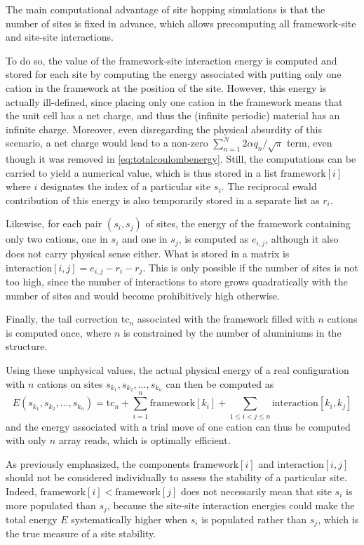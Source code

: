 \documentclass[main.tex]{subfiles}
\begin{document}
The main computational advantage of site hopping simulations is that the number of sites is fixed in advance, which allows precomputing all framework-site and site-site interactions.

To do so, the value of the framework-site interaction energy is computed and stored for each site by computing the energy associated with putting only one cation in the framework at the position of the site. However, this energy is actually ill-defined, since placing only one cation in the framework means that the unit cell has a net charge, and thus the (infinite periodic) material has an infinite charge. Moreover, even disregarding the physical absurdity of this scenario, a net charge would lead to a non-zero $\sum_{n=1}^N2\alpha q_n/\sqrt\pi$ term, even though it was removed in \cref{eq:totalcoulombenergy}. Still, the computations can be carried to yield a numerical value, which is thus stored in a list $\text{framework}[i]$ where $i$ designates the index of a particular site $s_i$. The reciprocal ewald contribution of this energy is also temporarily stored in a separate list as $r_i$.

Likewise, for each pair $(s_i,s_j)$ of sites, the energy of the framework containing only two cations, one in $s_i$ and one in $s_j$, is computed as $e_{i,j}$, although it also does not carry physical sense either. What is stored in a matrix is
$\text{interaction}[i,j] = e_{i,j} - r_i - r_j$.
This is only possible if the number of sites is not too high, since the number of interactions to store grows quadratically with the number of sites and would become prohibitively high otherwise.

Finally, the tail correction $\text{tc}_n$ associated with the framework filled with $n$ cations is computed once, where $n$ is constrained by the number of aluminiums in the structure.

Using these unphysical values, the actual physical energy of a real configuration with $n$ cations on sites $s_{k_1}, s_{k_2}, \ldots, s_{k_n}$ can then be computed as
\[E(s_{k_1}, s_{k_2}, \ldots, s_{k_n}) = \text{tc}_n + \sum_{i=1}^n\text{framework}[k_i] + \sum_{1\le i<j \le n}\text{interaction}[k_i,k_j]\]
and the energy associated with a trial move of one cation can thus be computed with only $n$ array reads, which is optimally efficient.

As previously emphasized, the components $\text{framework}[i]$ and $\text{interaction}[i,j]$ should not be considered individually to assess the stability of a particular site. Indeed, $\text{framework}[i] < \text{framework}[j]$ does not necessarily mean that site $s_i$ is more populated than $s_j$, because the site-site interaction energies could make the total energy $E$ systematically higher when $s_i$ is populated rather than $s_j$, which is the true measure of a site stability.
\end{document}
